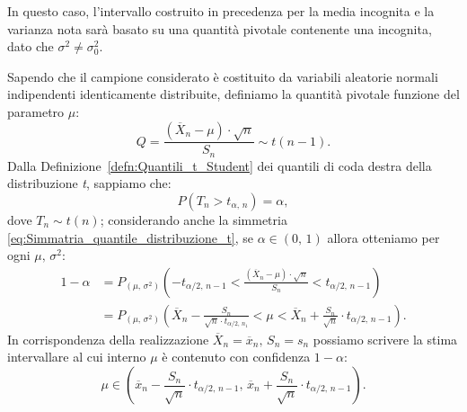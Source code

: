             \begin{prty}[Intervallo bilatero con $\mu =\,?,\, \sigma^2 =\,?$]
                In questo caso, l'intervallo costruito in precedenza per la media incognita e la varianza nota 
                sarà basato su una quantità pivotale contenente una incognita, dato che 
                $\sigma^2 \neq \sigma^2_0$.

                Sapendo che il campione considerato è costituito da variabili aleatorie normali indipendenti 
                identicamente distribuite, definiamo la quantità pivotale funzione del parametro $\mu$: \[
                    Q = \frac{(\overline{X}_n -\mu)\cdot \sqrt{n}}{S_n} \sim t(n-1)
                .\] Dalla Definizione~\ref{defn:Quantili_t_Student} dei quantili di coda destra della 
                distribuzione \emph{t}, sappiamo che: \[
                    P(T_n > t_{\alpha,\,n}) = \alpha
                ,\] dove $T_n \sim t(n)$; considerando anche la simmetria \eqref{eq:Simmatria_quantile_distribuzione_t}, se $\alpha \in (0,\,1)$ allora otteniamo per ogni $\mu,\, \sigma^2$:
                \begin{align*}
                    1-\alpha &= P_{(\mu,\,\sigma^2)}\left(-t_{\alpha /2,\,n-1} 
                    < \frac{(\overline{X}_n -\mu)\cdot \sqrt{n}}{S_n} < t_{\alpha /2,\,n-1}\right) \\
                    &= P_{(\mu,\,\sigma^2)}\left(\overline{X}_n -\frac{S_n}{\sqrt{n}\cdot t_{\alpha /2,\,n_1}} 
                    < \mu < \overline{X}_n + \frac{S_n}{\sqrt{n}}\cdot t_{\alpha /2,\,n-1}\right)
                .\end{align*}
                In corrispondenza della realizzazione $\overline{X}_n = \overline{x}_n,\, S_n = s_n$ possiamo 
                scrivere la stima intervallare al cui interno $\mu$ è contenuto con confidenza $1-\alpha$: \[
                    \mu \in \left(\overline{x}_n -\frac{S_n}{\sqrt{n}}\cdot t_{\alpha /2,\,n-1},\, 
                    \overline{x}_n +\frac{S_n}{\sqrt{n}}\cdot t_{\alpha /2,\,n-1}\right)
                .\] 
            \end{prty}
